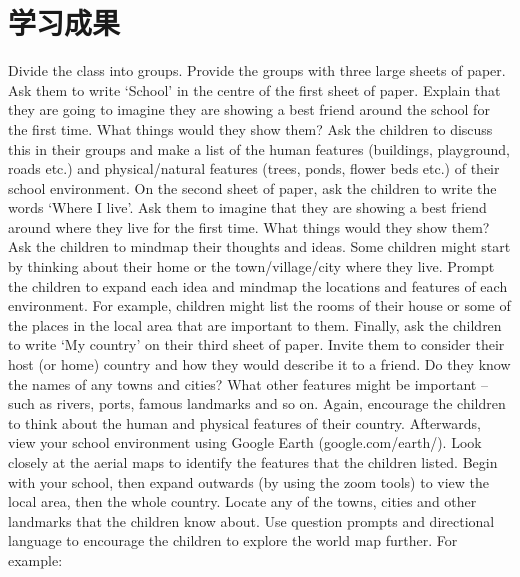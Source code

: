 \chapter{学习成果}

Divide the class into groups. Provide the groups with three large sheets of paper. Ask them to write ‘School’ in the centre of the first sheet of paper. Explain that they are going to imagine they are showing a best friend around the school for the first time. What things would they show them? Ask the children to discuss this in their groups and make a list of the human features (buildings, playground, roads etc.) and physical/natural features (trees, ponds, flower beds etc.) of their school environment.
On the second sheet of paper, ask the children to write the words ‘Where I live’. Ask them to imagine that they are showing a best friend around where they live for the first time. What things would they show them? Ask the children to mindmap their thoughts and ideas.
Some children might start by thinking about their home or the town/village/city where they live. Prompt the children to expand each idea and mindmap the locations and features of each environment. For example, children might list the rooms of their house or some of the places in the local area that are important to them.
Finally, ask the children to write ‘My country’ on their third sheet of paper. Invite them to consider their host (or home) country and how they would describe it to a friend. Do they know the names of any towns and cities? What other features might be important – such as rivers, ports, famous landmarks and so on. Again, encourage the children to think about the human and physical features of their country.
Afterwards, view your school environment using Google Earth (google.com/earth/). Look closely at the aerial maps to identify the features that the children listed. Begin with your school, then expand outwards (by using the zoom tools) to view the local area, then the whole country.
Locate any of the towns, cities and other landmarks that the children know about. Use question prompts and directional language to encourage the children to explore the world map further. For example:
